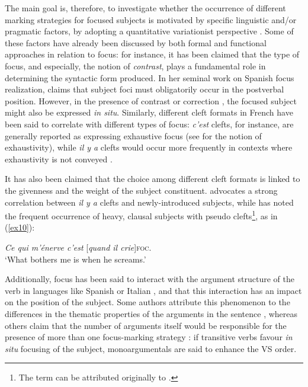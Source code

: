 The main goal is, therefore, to investigate whether the occurrence of different marking strategies for focused subjects is motivated by specific linguistic and/or pragmatic factors, by adopting a quantitative variationist perspective \parencite{labov1972sociolinguistic}. Some of these factors have already been discussed by both formal and functional approaches in relation to focus: for instance, it has been claimed that the type of focus, and especially, the notion of \textit{contrast}, plays a fundamental role in determining the syntactic form produced. In her seminal work on Spanish focus realization, \textcite{zubizarreta1998prosody} claims that subject foci must obligatorily occur in the postverbal position. However, in the presence of contrast or correction \parencite{van2004incompatibility, steube2001correction, REPP20101333}, the focused subject might also be expressed \textit{in situ}. Similarly, different cleft formats in French have been said to correlate with different types of focus: \textit{c'est} clefts, for instance, are generally reported as expressing exhaustive focus (see \cite{kiss1998identificational} for the notion of exhaustivity), while \textit{il y a} clefts would occur more frequently in contexts where exhaustivity is not conveyed \parencite{de2015status, karssenberg2017oiseaux}. 

It has also been claimed that the choice among different cleft formats is linked to the givenness \parencite{firbas1966non, chafe1970meaning, prince1992zpg} and the weight of the subject constituent. \textcite{lambrecht1996information} advocates a strong correlation between \textit{il y a} clefts and newly-introduced subjects, while \textcite{roubaud2000constructions} has noted the frequent occurrence of heavy, clausal subjects with pseudo clefts\footnote{The term can be attributed originally to \textcite{bach1968english}.}, as in (\ref{ex10}):

 \ea \label{ex10}
  \textit{Ce qui m'énerve c'est} {[\textit{quand il crie}]\textsc{foc}}\normalsize.\\
 `What bothers me is when he screams.' \hfill \parencite[178]{roubaud2000constructions}    
\z


Additionally, focus has been said to interact with the argument structure of the verb in languages like Spanish or Italian \parencite{burzio1986italian, rizzi1982issues, belletti1988case}, and that this interaction has an impact on the position of the subject. Some authors attribute this phenomenon to the differences in the thematic properties of the arguments in the sentence \parencite{gutierrez2013structural}, whereas others claim that the number of arguments itself would be responsible for the presence of more than one focus-marking strategy \parencite{gabriel2007fokus}: if transitive verbs favour \textit{in situ} focusing of the subject, monoargumentals are said to enhance the VS order.

